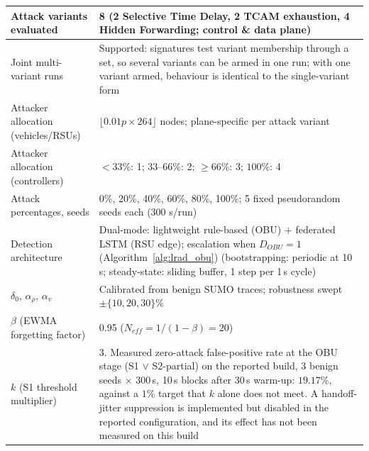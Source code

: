\documentclass[12pt, a4paper]{report}
\begin{document}
{{\begin{longtable}{|m{5.0cm}|m{9.0cm}|}
            \hline
            Attack variants evaluated & 8 (2 Selective Time Delay, 2 TCAM exhaustion, 4 Hidden Forwarding; control \& data plane) \\
\hline Joint multi-variant runs & Supported: signatures test variant membership through a set, so several variants can be armed in one run; with one variant armed, behaviour is identical to the single-variant form \\
            \hline
            Attacker allocation (vehicles/RSUs) &
              $\lfloor 0.01p \times 264 \rfloor$ nodes;
              plane-specific per attack variant \\
                \hline
             Attacker allocation (controllers) &
               $<33\%$: 1; $33$--$66\%$: 2;
              $\geq 66\%$: 3; $100\%$: 4 \\
            
            \hline
            Attack percentages, seeds & 0\%, 20\%, 40\%, 60\%, 80\%, 100\%; 5 fixed pseudorandom seeds each (300 s/run) \\
            \hline
            Detection architecture & Dual-mode: lightweight rule-based (OBU) + federated LSTM (RSU edge); escalation when $D_{OBU}=1$ (Algorithm~\ref{alg:lrad_obu}) (bootstrapping: periodic at 10\,s; steady-state: sliding buffer, 1 step per 1\,s cycle) \\
            \hline
            $\delta_0$, $\alpha_\rho$, $\alpha_v$ &
  Calibrated from benign SUMO traces;
  robustness swept $\pm\{10,20,30\}\%$ \\
  \hline
 $\beta$ (EWMA forgetting factor) &
  0.95 ($N_{eff}=1/(1-\beta)=20$) \\
   \hline
 $k$ (S1 threshold multiplier) &
  3. Measured zero-attack false-positive rate at the \ac{OBU} stage (S1 $\lor$ S2-partial) on the reported build, 3 benign seeds $\times$ 300\,s, 10\,s blocks after 30\,s warm-up: $19.17\%$, against a $1\%$ target that $k$ alone does not meet. A handoff-jitter suppression is implemented but disabled in the reported configuration, and its effect has not been measured on this build \\


\end{longtable}}}
\end{document}
